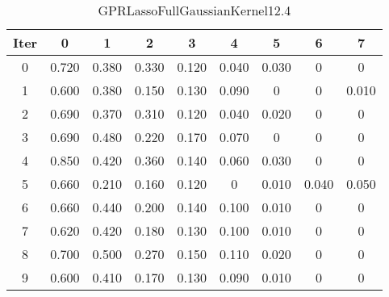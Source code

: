 \begin{table}
	\begin{center}
		\begin{tabular}{|c|c|c|c|c|c|c|c|c|}
			\hline
			Iter & 0 & 1 & 2 & 3 & 4 & 5 & 6 & 7 \\
			\hline
			0 & 0.720 & 0.380 & 0.330 & 0.120 & 0.040 & 0.030 & 0 & 0 \\
			\hline
			1 & 0.600 & 0.380 & 0.150 & 0.130 & 0.090 & 0 & 0 & 0.010 \\
			\hline
			2 & 0.690 & 0.370 & 0.310 & 0.120 & 0.040 & 0.020 & 0 & 0 \\
			\hline
			3 & 0.690 & 0.480 & 0.220 & 0.170 & 0.070 & 0 & 0 & 0 \\
			\hline
			4 & 0.850 & 0.420 & 0.360 & 0.140 & 0.060 & 0.030 & 0 & 0 \\
			\hline
			5 & 0.660 & 0.210 & 0.160 & 0.120 & 0 & 0.010 & 0.040 & 0.050 \\
			\hline
			6 & 0.660 & 0.440 & 0.200 & 0.140 & 0.100 & 0.010 & 0 & 0 \\
			\hline
			7 & 0.620 & 0.420 & 0.180 & 0.130 & 0.100 & 0.010 & 0 & 0 \\
			\hline
			8 & 0.700 & 0.500 & 0.270 & 0.150 & 0.110 & 0.020 & 0 & 0 \\
			\hline
			9 & 0.600 & 0.410 & 0.170 & 0.130 & 0.090 & 0.010 & 0 & 0 \\
			\hline
		\end{tabular}
	\end{center}
	\caption{GPRLassoFullGaussianKernel12.4}
\end{table}